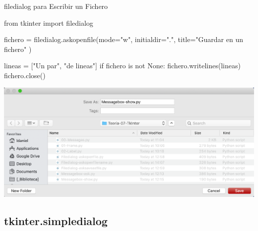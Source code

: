 \documentclass[10pt, envcountsect , spanish]{beamer}
\begin{document}
\begin{frame}[fragile]{filedialog para Escribir un  Fichero} 
\footnotesize
\begin{pyverbatim}[][frame=single]
from tkinter import filedialog

fichero = filedialog.askopenfile(mode="w",
    initialdir=".",
    title="Guardar en un fichero"
)

lineas = ["Un par\n", "de lineas\n"]
if fichero is not None:
    fichero.writelines(lineas)
    fichero.close()

\end{pyverbatim}

\centerline{\includegraphics[width=.65\textwidth]{fig/asksaveasfile} }

\end{frame}




\subsection{tkinter.simpledialog}
\end{document}
